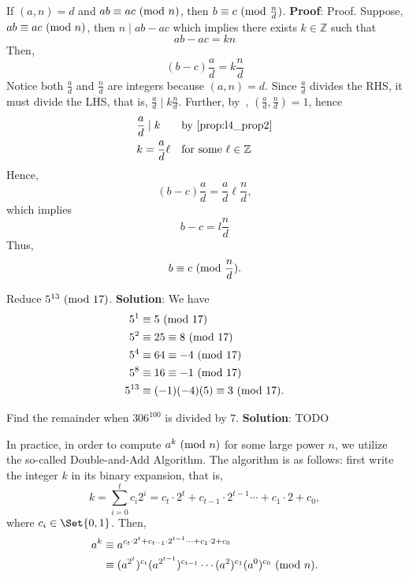 \begin{Proposition}{}{}
    If $ (a,n)=d $ and $ ab\equiv ac\ (\mathrm{mod}\ n) $, then $ b\equiv c\ (\mathrm{mod}\ \frac{n}{d}) $.
    \tcblower{}
    \textbf{Proof}:
    Proof. Suppose, $a b \equiv a c\ (\mathrm{mod}\ n)$, then $n \mid a b-a c$ which implies there exists $k \in \mathbb{Z}$ such that
    \[ a b-a c=k n \]
    Then,
    \[ (b-c) \frac{a}{d}=k \frac{n}{d} \]
    Notice both $\frac{a}{d}$ and $\frac{n}{d}$ are integers because $(a, n)=d$. Since $\frac{a}{d}$ divides the RHS,
    it must divide the LHS, that is, $\frac{a}{d} \mid k \frac{n}{d}$. Further, by~, $ (\frac{a}{d}, \frac{n}{d})=1$, hence
    \begin{align*}
         & \frac{a}{d}\mid  k &  & \text{by \Cref{prop:l4_prop2}}       \\
         & k=\frac{a}{d} \ell &  & \text{for some } \ell \in \mathbb{Z}
    \end{align*}
    Hence,
    \[ (b-c) \frac{a}{d}=\frac{a}{d} \ell \frac{n}{d}, \]
    which implies
    \[ b-c=l \frac{n}{d} \]
    Thus,
    \[ b \equiv c\ (\mathrm{mod}\ \frac{n}{d}). \]
\end{Proposition}
\begin{Example}{}{}
    Reduce $ 5^{13}\ (\mathrm{mod}\ 17) $.
    \tcblower{}
    \textbf{Solution}: We have
    \begin{align*}
        5^1    & \equiv 5\ (\mathrm{mod}\ 17)                    \\
        5^2    & \equiv 25\equiv 8\ (\mathrm{mod}\ 17)           \\
        5^4    & \equiv 64\equiv -4\ (\mathrm{mod}\ 17)          \\
        5^8    & \equiv 16\equiv -1\ (\mathrm{mod}\ 17)          \\
        5^{13} & \equiv (-1)(-4)(5)\equiv 3\ (\mathrm{mod}\ 17).
    \end{align*}
\end{Example}
\begin{Exercise}{}{}
    Find the remainder when $ 306^{100} $ is divided by $ 7 $.
    \tcblower{}
    \textbf{Solution}: TODO
\end{Exercise}
In practice, in order to compute $ a^k\ (\mathrm{mod}\ n) $ for some large power $ n $,
we utilize the so-called Double-and-Add Algorithm. The algorithm is as follows: first write
the integer $ k $ in its binary expansion, that is,
\[ k=\sum_{i=0}^{t}c_i 2^i=c_t\cdot 2^t+c_{t-1}\cdot 2^{t-1}\cdots+c_1\cdot 2+c_0, \]
where $ c_i\in\Set{0,1} $. Then,
\begin{align*}
    a^k & \equiv a^{c_t\cdot 2^t+c_{t-1}\cdot 2^{t-1}\cdots+c_1\cdot 2+c_0}                   \\
        & \equiv (a^{2^t})^{c_t}(a^{2^{t-1}})^{c_{t-1}}\cdots(a^2)^{c_1}(a^0)^{c_{0}}\ (\mathrm{mod}\ n).
\end{align*}
